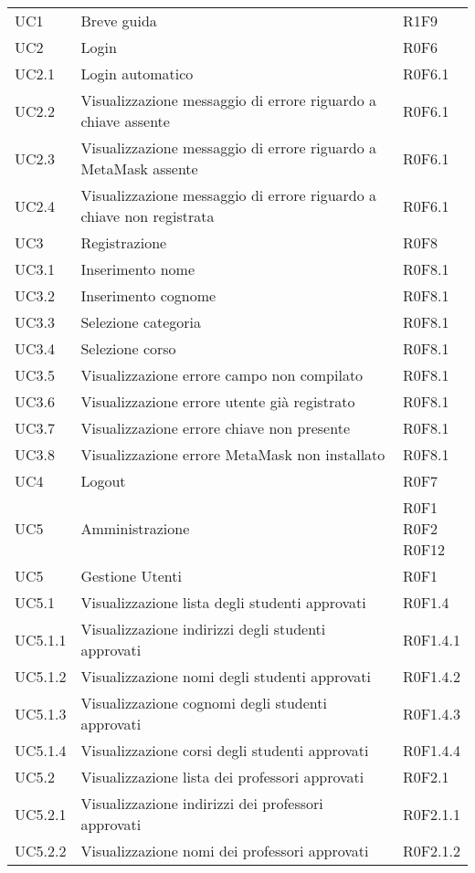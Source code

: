 \documentclass[AnalisiDeiRequisiti.tex]{subfiles}
\begin{document}
\begin{longtable}[H]{p{2cm}p{5cm}p{5cm}}
	UC1 & Breve guida & R1F9 \\
	UC2 & Login & R0F6 \\
	UC2.1 & Login automatico & R0F6.1 \\
	UC2.2 & Visualizzazione messaggio di errore riguardo a chiave assente & R0F6.1 \\
	UC2.3 & Visualizzazione messaggio di errore riguardo a MetaMask assente & R0F6.1 \\
	UC2.4 & Visualizzazione messaggio di errore riguardo a chiave non registrata & R0F6.1 \\
	UC3 & Registrazione & R0F8 \\
	UC3.1 & Inserimento nome & R0F8.1 \\
	UC3.2 & Inserimento cognome & R0F8.1 \\
	UC3.3 & Selezione categoria & R0F8.1 \\
	UC3.4 & Selezione corso & R0F8.1 \\
	UC3.5 & Visualizzazione errore campo non compilato & R0F8.1 \\
	UC3.6 & Visualizzazione errore utente già registrato & R0F8.1 \\
	UC3.7 & Visualizzazione errore chiave non presente & R0F8.1 \\
	UC3.8 & Visualizzazione errore MetaMask non installato & R0F8.1 \\
	UC4 & Logout & R0F7 \\
	UC5 & Amministrazione & \makecell[tl]{ R0F1 \\
		R0F2 \\
		R0F12 } \\
	UC5 & Gestione Utenti & R0F1 \\
	UC5.1 & Visualizzazione lista degli studenti approvati & R0F1.4 \\
	UC5.1.1 & Visualizzazione indirizzi degli studenti approvati & R0F1.4.1 \\
	UC5.1.2 & Visualizzazione nomi degli studenti approvati & R0F1.4.2 \\
	UC5.1.3 & Visualizzazione cognomi degli studenti approvati & R0F1.4.3 \\
	UC5.1.4 & Visualizzazione corsi degli studenti approvati & R0F1.4.4 \\
	UC5.2 & Visualizzazione lista dei professori approvati & R0F2.1 \\
	UC5.2.1 & Visualizzazione indirizzi dei professori approvati & R0F2.1.1 \\
	UC5.2.2 & Visualizzazione nomi dei professori approvati & R0F2.1.2 \\

\end{longtable}
\end{document}
